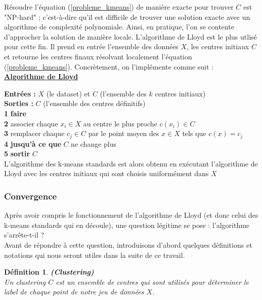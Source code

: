 \documentclass[12pt,a4paper]{book}
\newtheorem{env_definition}{Définition}
\newcommand{\1}{\mathds{1}}
\begin{document}
Résoudre l'équation (\ref{probleme_kmeans}) de manière exacte pour trouver $C$  est "NP-hard" ; c'est-à-dire qu'il est difficile de trouver une solution exacte avec un algorithme de complexité polynomiale. Ainsi, en pratique, l'on se contente d'approcher la solution de manière locale. L'algorithme de Lloyd est le plus utlisé pour cette fin. Il prend en entrée l'ensemble des données $X$, les centres initiaux $C$  et retourne les centres finaux résolvant localement l'équation (\ref{probleme_kmeans}). Concrètement, on l'implémente comme suit :  \\

\noindent \textbf{\underline{Algorithme de Lloyd}}\label{algo_lloyd}

\noindent \textbf{Entrées : } $X$ (le dataset) et $C$ (l'ensemble des $k$ centres initiaux)\\
\noindent \textbf{Sorties : } $C$ (l'ensemble des centres définitifs) \\
\textbf{1} \textbf{faire}\\
\textbf{2} \indent associer chaque $x_i \in X$ au centre le plus proche $c(x_i) \in C$\\
\textbf{3} \indent remplacer chaque $c_j \in C$ par le point moyen des $x \in X$ tels que $c(x)=c_j$\\
\textbf{4} \textbf{jusqu'à ce que } $C$ ne change plus\\
\textbf{5} \textbf{sortir} $C$ \\

L'algorithme des k-means standards est alors obtenu en exécutant l'algorithme de Lloyd avec les centres initiaux qui sont choisis uniformément dans $X$
\subsubsection{Convergence}

Après avoir compris le fonctionnement de l'algorithme de Lloyd (et donc celui des k-means standards qui en découle), une question légitime se pose : l'algorithme s'arrête-t-il ?\\ Avant de répondre à cette question, introduisons d'abord quelques définitions et notations qui nous seront utiles dans la suite de ce travail.

	\begin{env_definition}\label{clustering}
		\textbf{(Clustering)}\\
		Un clustering $C$ est un ensemble de centres qui sont utilisés pour déterminer le label de chaque point de notre jeu de données $X$.
	\end{env_definition}
	
\end{document}
